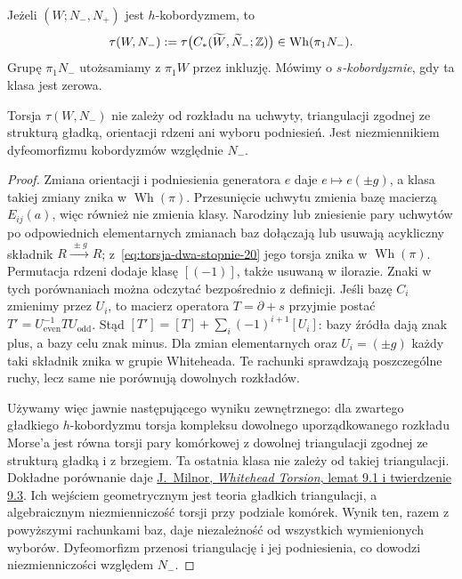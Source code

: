 \begin{definicja}
\label{def:torsja-hc-20}
Jeżeli $(W;N_-,N_+)$ jest $h$-kobordyzmem, to
\[
 \tau(W,N_-):=\tau\bigl(C_*(\widetilde W,
     \widetilde N_-;\mathbb{Z})\bigr)
 \in\operatorname{Wh}(\pi_1N_-).
\]
Grupę $\pi_1N_-$ utożsamiamy z $\pi_1W$ przez
inkluzję. Mówimy o \emph{$s$-kobordyzmie}, gdy
ta klasa jest zerowa.
\end{definicja}

\begin{stwierdzenie}
\label{prop:niezaleznosc-torsji-20}
Torsja $\tau(W,N_-)$ nie zależy od rozkładu na
uchwyty, triangulacji zgodnej ze strukturą gładką, orientacji rdzeni ani wyboru
podniesień. Jest niezmiennikiem dyfeomorfizmu
kobordyzmów względnie $N_-$.
\end{stwierdzenie}
\begin{proof}
Zmiana orientacji i podniesienia generatora
$e$ daje $e\mapsto e(\pm g)$, a klasa takiej
zmiany znika w $\operatorname{Wh}(\pi)$.
Przesunięcie uchwytu zmienia bazę macierzą
$E_{ij}(a)$, więc również nie zmienia klasy.
Narodziny lub zniesienie pary uchwytów po odpowiednich
elementarnych zmianach baz dołączają lub usuwają
acykliczny składnik $R\xrightarrow{\ \pm g\ }R$;
z~\eqref{eq:torsja-dwa-stopnie-20} jego torsja
znika w $\operatorname{Wh}(\pi)$.
Permutacja rdzeni dodaje klasę $[(-1)]$, także usuwaną w ilorazie.
Znaki w tych porównaniach można odczytać bezpośrednio z definicji.
Jeśli bazę $C_i$ zmienimy przez $U_i$, to macierz operatora
$T=\partial+s$ przyjmie postać
$T'=U_{\mathrm{even}}^{-1}TU_{\mathrm{odd}}$.
Stąd $[T']=[T]+\sum_i(-1)^{i+1}[U_i]$:
bazy źródła dają znak plus, a bazy celu znak minus.
Dla zmian elementarnych oraz $U_i=(\pm g)$ każdy taki
składnik znika w grupie Whiteheada.
Te rachunki sprawdzają poszczególne ruchy, lecz same nie
porównują dowolnych rozkładów.

Używamy więc jawnie następującego wyniku zewnętrznego:
dla zwartego gładkiego $h$-kobordyzmu torsja kompleksu
dowolnego uporządkowanego rozkładu Morse'a jest równa torsji
pary komórkowej z dowolnej triangulacji zgodnej ze strukturą
gładką i z brzegiem. Ta ostatnia klasa nie zależy od takiej
triangulacji. Dokładne porównanie daje
\href{https://webhomes.maths.ed.ac.uk/~v1ranick/papers/milnorwh.pdf}
{J.\ Milnor, \emph{Whitehead Torsion}, lemat 9.1 i twierdzenie 9.3}.
Ich wejściem geometrycznym jest teoria gładkich triangulacji,
a algebraicznym niezmienniczość torsji przy podziale komórek.
Wynik ten, razem z powyższymi rachunkami baz, daje niezależność
od wszystkich wymienionych wyborów. Dyfeomorfizm przenosi
triangulację i jej podniesienia, co dowodzi niezmienniczości
względem $N_-$.
\end{proof}

